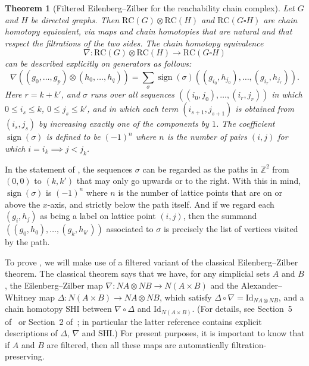 \documentclass[a4paper, 11 pt, oneside, reqno]{amsart}
\numberwithin{lemma}{section}
\newtheorem{theorem}[lemma]{Theorem}
\theoremstyle{definition}
\DeclareMathOperator{\sign}{sign}
\newcommand{\bpc}{\mathrm{RC}}
\newcommand{\RC}{\mathrm{RC}}
\begin{document}
\begin{theorem}[Filtered Eilenberg--Zilber for the reachability chain complex]
\label{thm:filt_EZ}
    Let \(G\) and \(H\) be directed graphs. 
    Then $\RC(G)\otimes\RC(H)$ and $\RC(G\square H)$
    are chain homotopy equivalent, via maps and chain
    homotopies that are natural and that 
    respect the filtrations of the two sides.
    The chain homotopy equivalence
    \[\nabla\colon \bpc(G) \otimes \bpc(H) \to \bpc(G \square H)\]
    can be described explicitly on generators as follows:
    \begin{equation}\label{eq:filt_EZ}
        \nabla
        \left(
        (g_0,\ldots,g_p)
        \otimes
        (h_0,\ldots,h_q)
        \right)
        =
        \sum_\sigma
        \sign(\sigma)
        ((g_{i_0},h_{j_0}),\ldots,(g_{i_r},h_{j_r})).
    \end{equation}
    Here $r=k+k'$, and $\sigma$ runs over all sequences
    $((i_0,j_0),\ldots,(i_r,j_r))$ in which 
    $0\leq i_s\leq k$, $0\leq j_s\leq k'$,
    and in which each term $(i_{s+1},j_{s+1})$ 
    is obtained from $(i_s,j_s)$ by increasing 
    exactly one of the components by $1$. 
    The coefficient $\sign(\sigma)$ is defined to be $(-1)^n$ where $n$ is the number of pairs $(i,j)$ for which $i=i_k\implies j< j_k$.
\end{theorem}

In the statement of , the sequences $\sigma$
can be regarded as the paths in $\mathbb{Z}^2$ from $(0,0)$
to $(k,k')$ that may only go upwards or to the right.
With this in mind, $\sign(\sigma)$ is $(-1)^n$
where $n$ is the number of lattice points 
that are on or above the $x$-axis,
and strictly below the path itself.
And if we regard each $(g_i,h_j)$ as being a label on lattice
point $(i,j)$, then the summand 
$((g_0,h_0),\ldots,(g_k,h_{k'}))$
associated to $\sigma$ is precisely the list of vertices
visited by the path.

To prove , we will make use of a filtered variant of the classical Eilenberg--Zilber theorem. The classical theorem says that
we have, for any simplicial sets $A$ and $B$, 
the Eilenberg--Zilber map
$\nabla\colon NA\otimes NB\to N(A\times B)$ and the Alexander--Whitney map
$\Delta\colon N(A\times B)\to NA\otimes NB$, which satisfy \(\Delta \circ \nabla = \mathrm{Id}_{NA \otimes NB}\),
and a chain homotopy $\mathrm{SHI}$
between $\nabla\circ\Delta$ 
and $\mathrm{Id}_{N(A\times B)}$.
(For details, see Section~5 of~\cite{EM1953}
or Section~2 of~\cite{GonzalezDiazReal};
in particular the latter reference contains
explicit descriptions of 
$\Delta$, $\nabla$ and $\mathrm{SHI}$.) For present purposes, it is important to know that if \(A\) and \(B\) are filtered, then all these maps are automatically filtration-preserving.
\end{document}
